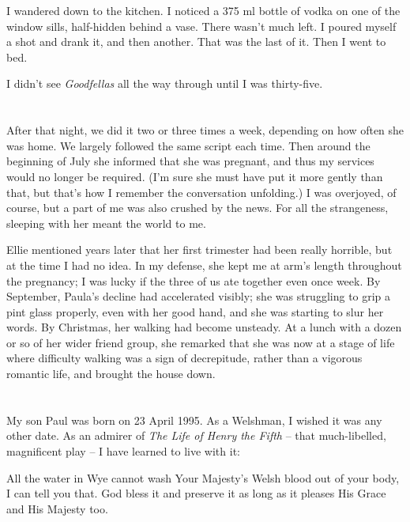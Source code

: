I wandered down to the kitchen. I noticed a 375 ml bottle of vodka on one of the window sills, half-hidden behind a vase. There wasn't much left. I poured myself a shot and drank it, and then another. That was the last of it. Then I went to bed.

I didn't see \textit{Goodfellas} all the way through until I was thirty-five.

\section{}

After that night, we did it two or three times a week, depending on how often she was home. We largely followed the same script each time. Then around the beginning of July she informed that she was pregnant, and thus my services would no longer be required. (I'm sure she must have put it more gently than that, but that's how I remember the conversation unfolding.) I was overjoyed, of course, but a part of me was also crushed by the news. For all the strangeness, sleeping with her meant the world to me.

Ellie mentioned years later that her first trimester had been really horrible, but at the time I had no idea. In my defense, she kept me at arm's length throughout the pregnancy; I was lucky if the three of us ate together even once week. By September, Paula's decline had accelerated visibly; she was struggling to grip a pint glass properly, even with her good hand, and she was starting to slur her words. By Christmas, her walking had become unsteady. At a lunch with a dozen or so of her wider friend group, she remarked that she was now at a stage of life where difficulty walking was a sign of decrepitude, rather than a vigorous romantic life, and brought the house down.

\section{}

My son Paul was born on 23 April 1995. As a Welshman, I wished it was any other date. As an admirer of \textit{The Life of Henry the Fifth} -- that much-libelled, magnificent play -- I have learned to live with it:

\begin{quoting}
    All the water in Wye cannot wash Your Majesty's Welsh blood out of your body, I can tell you that. God bless it and preserve it as long as it pleases His Grace and His Majesty too.
\end{quoting}

